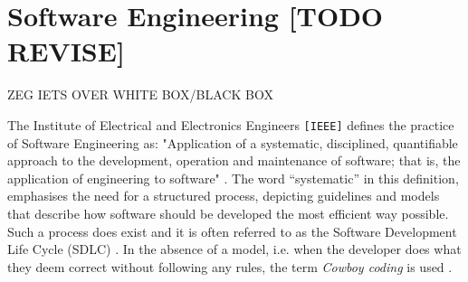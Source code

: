 
\chapter{Software Engineering [TODO REVISE]}

ZEG IETS OVER WHITE BOX/BLACK BOX

\label{ch:software-engineering}
The Institute of Electrical and Electronics Engineers \texttt{[IEEE]} defines the practice of Software Engineering as: "Application of a systematic, disciplined, quantifiable approach to the development, operation and maintenance of software; that is, the application of engineering to software" \cite[p.~421]{8016712}. The word ``systematic'' in this definition, emphasises the need for a structured process, depicting guidelines and models that describe how software should be developed the most efficient way possible. Such a process does exist and it is often referred to as the Software Development Life Cycle (SDLC) \cite[p.~420]{8016712}. In the absence of a model, i.e. when the developer does what they deem correct without following any rules, the term \emph{Cowboy coding} is used \cite[p.~34]{landry2011iterative}.


\newpage


